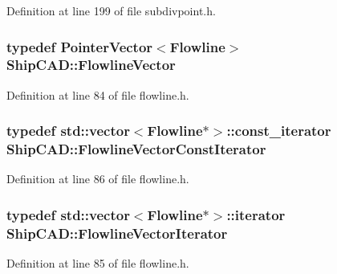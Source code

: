 Definition at line 199 of file subdivpoint.\+h.

\subsubsection[{\texorpdfstring{Flowline\+Vector}{FlowlineVector}}]{\setlength{\rightskip}{0pt plus 5cm}typedef {\bf Pointer\+Vector}$<${\bf Flowline}$>$ {\bf Ship\+C\+A\+D\+::\+Flowline\+Vector}}\hypertarget{namespaceShipCAD_a266f1cbe13c1087079b277baa825b85d}{}\label{namespaceShipCAD_a266f1cbe13c1087079b277baa825b85d}


Definition at line 84 of file flowline.\+h.

\subsubsection[{\texorpdfstring{Flowline\+Vector\+Const\+Iterator}{FlowlineVectorConstIterator}}]{\setlength{\rightskip}{0pt plus 5cm}typedef std\+::vector$<${\bf Flowline}$\ast$$>$\+::const\+\_\+iterator {\bf Ship\+C\+A\+D\+::\+Flowline\+Vector\+Const\+Iterator}}\hypertarget{namespaceShipCAD_af5ce87bb0e3720999cde4b18b32aeca3}{}\label{namespaceShipCAD_af5ce87bb0e3720999cde4b18b32aeca3}


Definition at line 86 of file flowline.\+h.

\subsubsection[{\texorpdfstring{Flowline\+Vector\+Iterator}{FlowlineVectorIterator}}]{\setlength{\rightskip}{0pt plus 5cm}typedef std\+::vector$<${\bf Flowline}$\ast$$>$\+::iterator {\bf Ship\+C\+A\+D\+::\+Flowline\+Vector\+Iterator}}\hypertarget{namespaceShipCAD_adea57d928a6348cab7a6a452cca5853f}{}\label{namespaceShipCAD_adea57d928a6348cab7a6a452cca5853f}


Definition at line 85 of file flowline.\+h.

